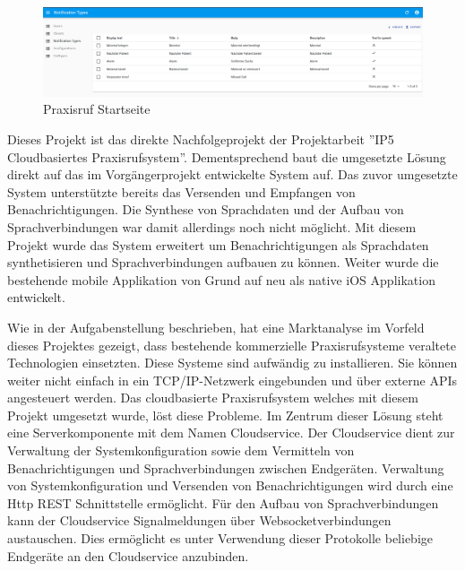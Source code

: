 \begin{figure}[h]
    \centering
    \begin{minipage}[b]{1\textwidth}
        \includegraphics[width=\textwidth]{graphics/screenshots/admin_ui_notification_types}
        \caption{Praxisruf Startseite}
    \end{minipage}
    \label{fig:AdminUI-Introduction}
\end{figure}

Dieses Projekt ist das direkte Nachfolgeprojekt der Projektarbeit ''IP5 Cloudbasiertes Praxisrufsystem''.
Dementsprechend baut die umgesetzte Lösung direkt auf das im Vorgängerprojekt entwickelte System auf.
Das zuvor umgesetzte System unterstützte bereits das Versenden und Empfangen von Benachrichtigungen.
Die Synthese von Sprachdaten und der Aufbau von Sprachverbindungen war damit allerdings noch nicht möglicht.
Mit diesem Projekt wurde das System erweitert um Benachrichtigungen als Sprachdaten synthetisieren und Sprachverbindungen aufbauen zu können.
Weiter wurde die bestehende mobile Applikation von Grund auf neu als native iOS Applikation entwickelt.

Wie in der Aufgabenstellung beschrieben, hat eine Marktanalyse im Vorfeld dieses Projektes gezeigt, dass bestehende kommerzielle Praxisrufsysteme veraltete Technologien einsetzten.
Diese Systeme sind aufwändig zu installieren.
Sie können weiter nicht einfach in ein TCP/IP-Netzwerk eingebunden und über externe APIs angesteuert werden.\cite{aufgabenstellung}
Das cloudbasierte Praxisrufsystem welches mit diesem Projekt umgesetzt wurde, löst diese Probleme.
Im Zentrum dieser Lösung steht eine Serverkomponente mit dem Namen Cloudservice.
Der Cloudservice dient zur Verwaltung der Systemkonfiguration sowie dem Vermitteln von Benachrichtigungen und Sprachverbindungen zwischen Endgeräten.
Verwaltung von Systemkonfiguration und Versenden von Benachrichtigungen wird durch eine Http REST Schnittstelle ermöglicht.
Für den Aufbau von Sprachverbindungen kann der Cloudservice Signalmeldungen über Websocketverbindungen austauschen.
Dies ermöglicht es unter Verwendung dieser Protokolle beliebige Endgeräte an den Cloudservice anzubinden.

